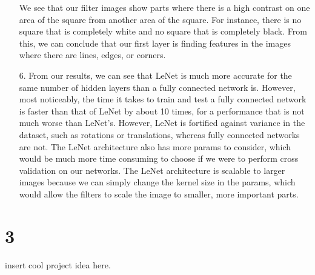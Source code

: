 \documentclass[11pt]{article}
\begin{document}
\begin{itemize}
We see that our filter images show parts where there is a high contrast on one area of the square from another area of the square. For instance, there is no square that is completely white and no square that is completely black. From this, we can conclude that our first layer is finding features in the images where there are lines, edges, or corners. 
\item[6.] From our results, we can see that LeNet is much more accurate for the same number of hidden layers than a fully connected network is. However, most noticeably, the time it takes to train and test a fully connected network is faster than that of LeNet by about 10 times, for a performance that is not much worse than LeNet's. However, LeNet is fortified against variance in the dataset, such as rotations or translations, whereas fully connected networks are not. The LeNet architecture also has more params to consider, which would be much more time consuming to choose if we were to perform cross validation on our networks. The LeNet architecture is scalable to larger images because we can simply change the kernel size in the params, which would allow the filters to scale the image to smaller, more important parts.
\end{itemize}
\newpage
\section*{3}
insert cool project idea here.
\end{document}
